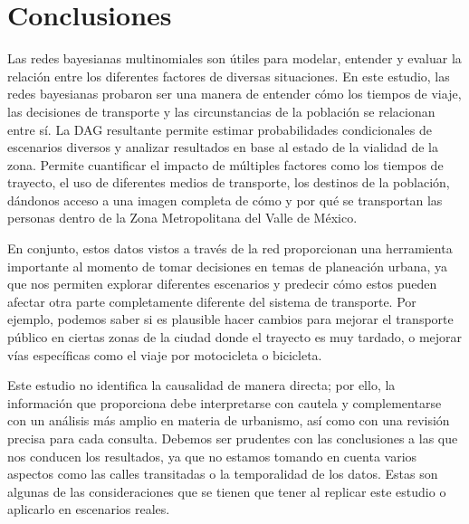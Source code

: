 \documentclass[eng]{ajceam-class}
\begin{document}
\section{Conclusiones}
Las redes bayesianas multinomiales son útiles para modelar, entender y evaluar la relación entre los diferentes factores de diversas situaciones. En este estudio, las redes bayesianas probaron ser una manera de entender cómo los tiempos de viaje, las decisiones de transporte y las circunstancias de la población se relacionan entre sí. La DAG resultante permite estimar probabilidades condicionales de escenarios diversos y analizar resultados en base al estado de la vialidad de la zona. Permite cuantificar el impacto de múltiples factores como los tiempos de trayecto, el uso de diferentes medios de transporte, los destinos de la población, dándonos acceso a una imagen completa de cómo y por qué se transportan las personas dentro de la Zona Metropolitana del Valle de México.

En conjunto, estos datos vistos a través de la red proporcionan una herramienta importante al momento de tomar decisiones en temas de planeación urbana, ya que nos permiten explorar diferentes escenarios y predecir cómo estos pueden afectar otra parte completamente diferente del sistema de transporte. Por ejemplo, podemos saber si es plausible hacer cambios para mejorar el transporte público en ciertas zonas de la ciudad donde el trayecto es muy tardado, o mejorar vías específicas como el viaje por motocicleta o bicicleta. 

Este estudio no identifica la causalidad de manera directa; por ello, la información que proporciona debe interpretarse con cautela y complementarse con un análisis más amplio en materia de urbanismo, así como con una revisión precisa para cada consulta. Debemos ser prudentes con las conclusiones a las que nos conducen los resultados, ya que no estamos tomando en cuenta varios aspectos como las calles transitadas o la temporalidad de los datos. Estas son algunas de las consideraciones que se tienen que tener al replicar este estudio o aplicarlo en escenarios reales.

\end{document}
